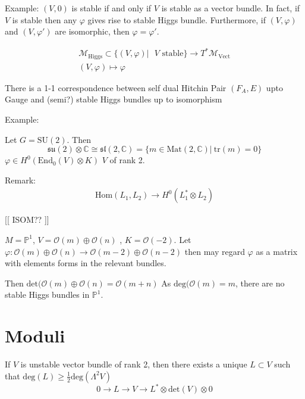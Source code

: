 Example: $(V,0)$ is stable if and only if $ V$ is stable as a vector bundle. 
In fact, if $ V$ is stable then any $\varphi$ gives rise to stable Higgs bundle. 
Furthermore, if $(V, \varphi)$ and $(V, \varphi') $ are isomorphic, then $ \varphi = \varphi'$.

\begin{align}
    \mathcal{M}_{\mathrm{Higgs}} \subset \{ ( V,\varphi) | \mbox{ $V$ stable} \} \rightarrow T^* \mathcal{M}_{\mathrm{Vect}} \\
    ( V, \varphi) \mapsto \varphi 
\end{align}

There is a 1-1 correspondence between self dual  Hitchin Pair $(F_A , E) $ upto Gauge 
and (semi?) stable Higgs bundles up to isomorphism 

Example: 

Let $ G = \mathrm{SU}(2) $. 
Then 
\begin{equation}
    \mathfrak{su}(2) \otimes \mathbb{C}  \cong \mathfrak{sl}(2, \mathbb{C} ) = \{ m \in \mathrm{Mat}(2, \mathbb{C} )| ~ \mathrm{tr}(m) = 0 \}
\end{equation}
$ \varphi \in H^0 ( \mathrm{End} _0 ( V) \otimes K) $ 
$V$ of rank 2. 

Remark: 
\begin{align}
    \mathrm{Hom} ( L_1 , L_2 ) \rightarrow  H^0 ( L_1 ^* \otimes L_2 ) 
\end{align}

[[ ISOM?? ]] 

$M = \mathbb{P} ^1 $, $V = \mathcal{O} (m) \oplus \mathcal{O} (n) $ , $K = \mathcal{O}(-2) $. 
Let $ \varphi: \mathcal{O} ( m) \oplus \mathcal{O} ( n) \rightarrow  \mathcal{O} (m -2) \oplus \mathcal{O} (n-2) $ 
then may regard $\varphi $ as a matrix with elements forms in the relevant bundles. 

Then $ \mathrm{det}(\mathcal{O} ( m) \oplus \mathcal{O} (n) = \mathcal{O} (m+n) $
As $ \mathrm{deg}( \mathcal{O} (m) = m $, there are no stable Higgs bundles in $\mathbb{P} ^1$. 


\section{Moduli} %


\begin{proposition}
If $V$ is unstable vector bundle of rank 2, 
then there exists a unique $L \subset V$ such that
$ \mathrm{deg}(L) \geq \frac{1}{2} \mathrm{deg} (\Lambda^2 V ) $ 
\begin{equation}
    0 \rightarrow  L \rightarrow V \rightarrow  L^* \otimes \mathrm{det} (V) \otimes 0 
\end{equation}
\end{proposition}

